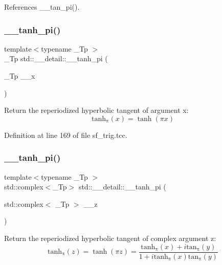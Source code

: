 References \+\_\+\+\_\+tan\+\_\+pi().

\mbox{\label{namespacestd_1_1____detail_ab0c02d3c15b8297df52b74807f22169b}} 
\subsubsection{\texorpdfstring{\+\_\+\+\_\+tanh\+\_\+pi()}{\_\_tanh\_pi()}\hspace{0.1cm}{\footnotesize\ttfamily [1/2]}}
{\footnotesize\ttfamily template$<$typename \+\_\+\+Tp $>$ \\
\+\_\+\+Tp std\+::\+\_\+\+\_\+detail\+::\+\_\+\+\_\+tanh\+\_\+pi (\begin{DoxyParamCaption}\item[{\+\_\+\+Tp}]{\+\_\+\+\_\+x }\end{DoxyParamCaption})}

Return the reperiodized hyperbolic tangent of argument x\+: \[ \mathrm{tanh_\pi}(x) = \tanh(\pi x) \] 

Definition at line 169 of file sf\+\_\+trig.\+tcc.

\mbox{\label{namespacestd_1_1____detail_a75775747d40813d5d54c0b7a7d0c39f0}} 
\subsubsection{\texorpdfstring{\+\_\+\+\_\+tanh\+\_\+pi()}{\_\_tanh\_pi()}\hspace{0.1cm}{\footnotesize\ttfamily [2/2]}}
{\footnotesize\ttfamily template$<$typename \+\_\+\+Tp $>$ \\
std\+::complex$<$\+\_\+\+Tp$>$ std\+::\+\_\+\+\_\+detail\+::\+\_\+\+\_\+tanh\+\_\+pi (\begin{DoxyParamCaption}\item[{std\+::complex$<$ \+\_\+\+Tp $>$}]{\+\_\+\+\_\+z }\end{DoxyParamCaption})}

Return the reperiodized hyperbolic tangent of complex argument z\+: \[ \mathrm{tanh_\pi}(z) = \tanh(\pi z) = \frac{\mathrm{tanh_\pi}(x) + i \mathrm{tan_\pi}(y)} {1 + i \mathrm{tanh_\pi}(x) \mathrm{tan_\pi}(y)} \] 

